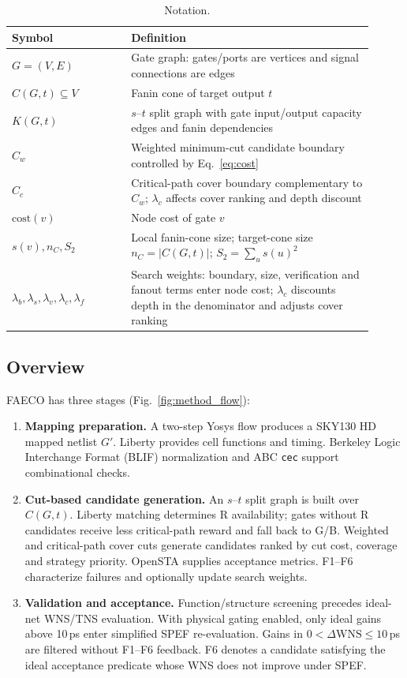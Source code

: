 \documentclass[preprint,12pt]{elsarticle}
\begin{document}
\begin{table}[htbp]
\centering\small
\caption{Notation.}\label{tab:symbols}
\begin{tabular}{p{0.30\linewidth}p{0.61\linewidth}}\toprule
Symbol & Definition\\\midrule
$G=(V,E)$ & Gate graph: gates/ports are vertices and signal connections are edges\\
$C(G,t)\subseteq V$ & Fanin cone of target output $t$\\
$K(G,t)$ & $s$--$t$ split graph with gate input/output capacity edges and fanin dependencies\\
$C_w$ & Weighted minimum-cut candidate boundary controlled by Eq.~\eqref{eq:cost}\\
$C_c$ & Critical-path cover boundary complementary to $C_w$; $\lambda_c$ affects cover ranking and depth discount\\
$\mathrm{cost}(v)$ & Node cost of gate $v$\\
$s(v),n_C,S_2$ & Local fanin-cone size; target-cone size $n_C=|C(G,t)|$; $S_2=\sum_u s(u)^2$\\
$\lambda_b,\lambda_s,\lambda_v,\lambda_c,\lambda_f$ & Search weights: boundary, size, verification and fanout terms enter node cost; $\lambda_c$ discounts depth in the denominator and adjusts cover ranking\\\bottomrule
\end{tabular}
\end{table}

\subsection{Overview}\label{sec:overview}
FAECO has three stages (Fig.~\ref{fig:method_flow}):
\begin{enumerate}
\item \textbf{Mapping preparation.} A two-step Yosys flow produces a SKY130 HD mapped netlist $G'$. Liberty provides cell functions and timing. Berkeley Logic Interchange Format (BLIF) normalization and ABC \texttt{cec}\cite{abc} support combinational checks.
\item \textbf{Cut-based candidate generation.} An $s$--$t$ split graph is built over $C(G,t)$. Liberty matching determines R availability; gates without R candidates receive less critical-path reward and fall back to G/B. Weighted and critical-path cover cuts generate candidates ranked by cut cost, coverage and strategy priority. OpenSTA supplies acceptance metrics. F1--F6 characterize failures and optionally update search weights.
\item \textbf{Validation and acceptance.} Function/structure screening precedes ideal-net WNS/TNS evaluation. With physical gating enabled, only ideal gains above 10\,ps enter simplified SPEF re-evaluation. Gains in $0<\Delta\mathrm{WNS}\le10$\,ps are filtered without F1--F6 feedback. F6 denotes a candidate satisfying the ideal acceptance predicate whose WNS does not improve under SPEF.
\end{enumerate}
\end{document}
